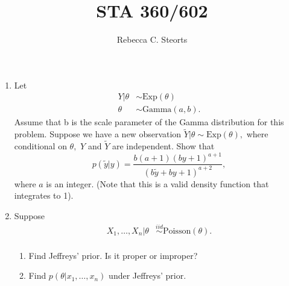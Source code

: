 \documentclass[11pt]{article}
\begin{document}
\title{STA 360/602}
\author{Rebecca C. Steorts}
\maketitle
\setlength{\parindent}{0cm}
\thispagestyle{empty}
\begin{enumerate}

\item Let
\begin{align*}
Y|\theta &\sim \text{Exp}(\theta)\\
\theta &\sim \text{Gamma}(a,b). \end{align*}
 Assume that b is the scale parameter of the Gamma distribution for this problem.
Suppose we have a new observation $\tilde{Y}|\theta \sim 
\text{Exp}(\theta),$ where conditional on $\theta,$ $Y$ and 
$\tilde{Y}$ are independent. Show that 
$$p(\tilde{y}|y) = \frac{b(a+1)(by+1)^{a+1}}{(b\tilde{y} + by + 1)^{a+2}},$$ where $a$ is an integer. (Note that this is a valid density function that integrates to 1).

\item Suppose
\begin{align*}
X_1,\ldots,X_n|\theta &\stackrel{iid}{\sim} \text{Poisson}(\theta).\\
\end{align*}
\begin{enumerate}
\item Find Jeffreys' prior. Is it proper or improper? 
\item Find $p(\theta|x_1,\ldots,x_n)$ under Jeffreys' prior.
\end{enumerate}




\end{enumerate}
\end{document}
